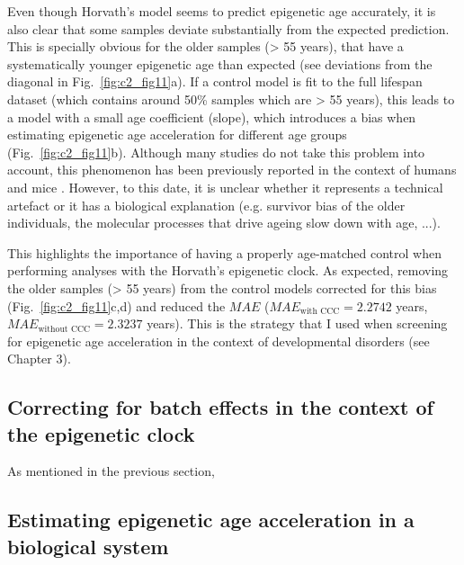 \bigskip

Even though Horvath's model seems to predict epigenetic age accurately, it is also clear that some samples deviate substantially from the expected prediction. This is specially obvious for the older samples (> 55 years), that have a systematically younger epigenetic age than expected (see deviations from the diagonal in  Fig.~\ref{fig:c2_fig11}a). If a control model is fit to the full lifespan dataset (which contains around 50\% samples which are > 55 years), this leads to a model with a small age coefficient (slope), which introduces a bias when estimating epigenetic age acceleration for different age groups (Fig.~\ref{fig:c2_fig11}b). Although many studies do not take this problem into account, this phenomenon has been previously reported in the context of humans \cite{ElKhoury2018,Marioni2018} and mice \cite{Stubbs2017}. However, to this date, it is unclear whether it represents a technical artefact or it has a biological explanation (e.g. survivor bias of the older individuals, the molecular processes that drive ageing slow down with age, ...). 

\bigskip

This highlights the importance of having a properly age-matched control when performing analyses with the Horvath's epigenetic clock. As expected, removing the older samples (> 55 years) from the control models corrected for this bias (Fig.~\ref{fig:c2_fig11}c,d) and reduced the $MAE$ ($MAE_{\text{with CCC}} = 2.2742$ years, $MAE_{\text{without CCC}} = 2.3237$ years). This is the strategy that I used when screening for epigenetic age acceleration in the context of developmental disorders (see Chapter 3).

\smallskip

\subsection{Correcting for batch effects in the context of the epigenetic clock}

\smallskip

As mentioned in the previous section, 

\smallskip

\subsection{Estimating epigenetic age acceleration in a biological system}

\smallskip

